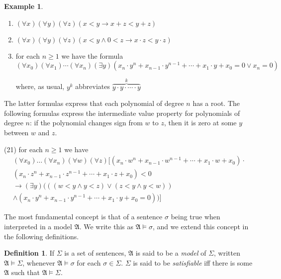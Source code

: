 \documentclass[titlepage, oneside]{amsbook}
\theoremstyle{plain}
\theoremstyle{definition}
\newtheorem{examples}{Example}
\newtheorem{definition}{Definition}
\theoremstyle{remark}
\newcommand{\ma}{\ensuremath{\mathfrak{A}}}
\begin{document}
\begin{examples}
\begin{enumerate}
\item $( \forall x)(\forall y)(\forall z) (x < y \to x +z < y+z)$


\item $(\forall x)(\forall y)(\forall z) (x < y \wedge 0 < z \to x
\cdot z < y 
\cdot z)$



\item for each $n \geq 1$ we have the formula
\[ (\forall x_{0})(\forall x_{1}) \cdots (\forall x_{n})(\exists y)
(x_{n} \cdot y^{n} + 
x_{n-1} \cdot y^{n-1} + \cdots + x_{1} \cdot y +x_{0} = 0 
\vee x_{n} =0)
\]

where, as usual, $y^{k}$ abbreviates $\overbrace{y \cdot y \cdot
\cdots \cdot y}^{k}$ 
 
\end{enumerate}

The latter formulas express that each polynomial of degree $n$ has a
root.  The following formulas express the intermediate value property
for polynomials of degree $n$: if the polynomial changes sign from $w$
to $z$, then it is zero at some $y$ between $w$ and $z$.




(21) for each $n \geq 1$ we have  \begin{multline*}
 (\forall x_0) \dots (\forall x_n) 
(\forall w ) (\forall z) [ (x_n \cdot w^n + x_{n-1} \cdot w^{n-1} +
\cdots + x_1 \cdot w + x_0 )\cdot \\
 (x_n \cdot z^n + x_{n-1} \cdot z^{n-1} + \cdots + x_1 \cdot z + x_0)
<0 \\
\to (\exists y)((( w< y \wedge y < z ) \vee (z < y \wedge y < w ))\\
\wedge (x_n \cdot y^n + x_{n-1}
\cdot y^{n-1} + \cdots + x_1 \cdot y + x_0 = 0 ))] 
\end{multline*} 



\end{examples}

The most fundamental concept is that of a sentence $\sigma$ being true
when interpreted in a model $\ma$.  We write this as $\ma \models
\sigma$, and we extend this concept in the following definitions.


\begin{definition}
\index{$\models$}%
%
 If $\Sigma$ is a set of
sentences, $\mathfrak{A}$ is
said to be a 
\emph{model} of $\Sigma$, written $\mathfrak{A} \models \Sigma$, 
whenever 
$\mathfrak{A} \models \sigma $ for each $\sigma \in \Sigma$.
 $\Sigma $ is said to be \emph{satisfiable} iff there
is some 
$\mathfrak{A}$ such that $\mathfrak{A} \models \Sigma$.

\end{definition}
\end{document}
